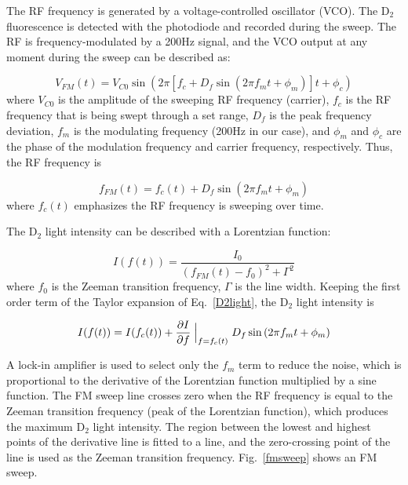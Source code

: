The RF frequency is generated by a voltage-controlled oscillator (VCO). The D$_{2}$ fluorescence is detected with the photodiode and recorded during the sweep. The RF is frequency-modulated by a 200Hz signal, and the VCO output at any moment during the sweep can be described as: 

\begin{equation}
V_{FM}(t)=V_{C0}\sin{\left(2\pi[f_{c}+D_{f}\sin{\left(2\pi f_{m}t+\phi_{m}\right)}]t+\phi_{c}\right)}
\end{equation}
where $V_{C0}$ is the amplitude of the sweeping RF frequency (carrier), $f_{c}$ is the RF frequency that is being swept through a set range, $D_{f}$ is the peak frequency deviation, $f_{m}$ is the modulating frequency (200Hz in our case), and $\phi_{m}$ and $\phi_{c}$ are the phase of the modulation frequency and carrier frequency, respectively. Thus, the RF frequency is

\begin{equation}
f_{FM}(t) = f_{c}(t)+D_{f}\sin{\left(2\pi f_{m}t+\phi_{m}\right)}
\end{equation}
where $f_{c}(t)$ emphasizes the RF frequency is sweeping over time. 

The D$_{2}$ light intensity can be described with a Lorentzian function:

\begin{equation}\label{D2light}
I(f(t))=\frac{I_{0}}{(f_{FM}(t)-f_{0})^{2}+\Gamma^{2}}
\end{equation}
where $f_{0}$ is the Zeeman transition frequency, $\Gamma$ is the line width. Keeping the first order term of the Taylor expansion of Eq.~\ref{D2light}, the D$_{2}$ light intensity is

\begin{equation}
I(f(t))=I(f_{c}(t))+\frac{\partial I}{\partial f}\Bigm|_{f=f_{c}(t)}D_{f}\sin{\left(2\pi f_{m}t+\phi_{m}\right)}
\end{equation}

A lock-in amplifier is used to select only the $f_{m}$ term to reduce the noise, which is proportional to the derivative of the Lorentzian function multiplied by a sine function. The FM sweep line crosses zero when the RF frequency is equal to the Zeeman transition frequency (peak of the Lorentzian function), which produces the maximum D$_{2}$ light intensity. The region between the lowest and highest points of the derivative line is fitted to a line, and the zero-crossing point of the line is used as the Zeeman transition frequency. Fig.~\ref{fmsweep} shows an FM sweep.

